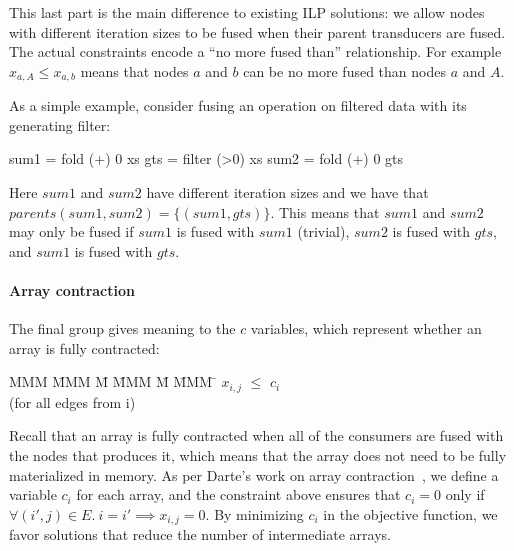 This last part is the main difference to existing ILP solutions: we allow nodes with different iteration sizes to be fused when their parent transducers are fused. The actual constraints encode a ``no more fused than'' relationship. For example $x_{a,A} \le x_{a,b}$ means that nodes $a$ and $b$ can be no more fused than nodes $a$ and $A$. 

As a simple example, consider fusing an operation on filtered data with its generating filter:
\begin{code}
    sum1 = fold (+) 0  xs
    gts  = filter (>0) xs
    sum2 = fold (+) 0  gts
\end{code}

Here $sum1$ and $sum2$ have different iteration sizes and we have that $parents(sum1, sum2) = \{(sum1, gts)\}$. This means that $sum1$ and $sum2$ may only be fused if $sum1$ is fused with $sum1$ (trivial), $sum2$ is fused with $gts$, and $sum1$ is fused with $gts$.




\paragraph{Array contraction} The final group gives meaning to the $c$ variables, which represent whether an array is fully contracted:
\begin{tabbing}
MMM     \= MMM \= M \= MMM \= M \= MMM \= \kill
        \> $x_{i,j}$    \> $\le$ \> $c_i$  \> \> \\
        \> (for all edges from i)
\end{tabbing}

Recall that an array is fully contracted when all of the consumers are fused with the nodes that produces it, which means that the array does not need to be fully materialized in memory. As per Darte's work on array contraction~\cite{darte2002contraction}, we define a variable $c_i$ for each array, and the constraint above ensures that $c_i = 0$ only if $\forall (i',j) \in E.\ i = i' \implies x_{i,j} = 0$. By minimizing $c_i$ in the objective function, we favor solutions that reduce the number of intermediate arrays.


